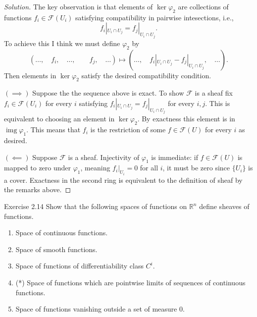 \begin{proof}[Solution]\leavevmode
The key observation is that elements of $\ker \varphi_2$ are collections of functions $f_i \in \mathcal{F}(U_i)$ satisfying compatibility in pairwise intesections, i.e.,
\[f_i|_{U_i \cap U_j}=f_j|_{U_i \cap U_j}.\]
{\color{2}To achieve this} I think we must define $\varphi_2$ by
\[(\ldots,\quad f_i,\quad \ldots,\quad \quad f_j,\quad \ldots)\longmapsto (\ldots,\quad f_i|_{U_i \cap U_j}-f_j|_{U_i \cap U_j},\quad \ldots).\]
Then elements in $\ker \varphi_2$ satisfy the desired compatibility condition.
\iffalse
{\color{2}Indeed:} if $f_i \in \mathcal{F}(U_i)$ and $f_j\in \mathcal{F}(U_j)$ are coordinates of some $F \in \prod_{i}\mathcal{F}(U_i)$, the image of $F$ under  $\varphi_2$ is of the form
\[(\ldots,\;\;\;f_i|_{U_i \cap U_j},\;\;\;\ldots,\;\;\;-f_i|_{U_j \cap U_i},\;\;\;\ldots,\;\;\;f_j|_{U_i \cap U_j},\;\;\;\ldots,\;\;\;-f_j|_{U_j \cap U_i},\;\;\;\ldots)\]
which we assume to be the zero element of $\prod_{i \neq j}\mathcal{F}(U_i \cap U_j)$.\fi

$(\implies )$ Suppose the the sequence above is exact. To show $\mathcal{F}$ is a sheaf fix $f_i \in \mathcal{F}(U_i)$ for every $i$ satisfying $f_i|_{U_i \cap U_j} = f_j |_{U_i \cap U_j}$ for every $i,j$. This is equivalent to choosing an element in $\ker \varphi_2$. By exactness this element is in $\operatorname{img} \varphi_1$. This means that $f_i$ is the restriction of some $f \in \mathcal{F}(U)$ for every $i$ as desired.

$(\impliedby)$ Suppose $\mathcal{F}$ is a sheaf. Injectivity of $\varphi_1$ is immediate: if $f \in \mathcal{F}(U)$ is mapped to zero under $\varphi_1$, meaning $f_i|_{U_i}=0$ for all $i$, it must be zero since $\{U_i\}$ is a cover. Exactness in the second ring is equivalent to the definition of sheaf by the remarks above.
\end{proof} 

\begin{thing4}{Exercise 2.14}\label{exer:2.14}\leavevmode
Show that the following spaces of functions on $\mathbb{R}^n$ define sheaves of functions.
\begin{enumerate}[label=(\alph*)]
\item Space of continuous functions.
\item Space of  smooth functions.
\item Space of functions of differentiability class $C^i$.
\item (*) Space of functions which are pointwise limits of sequences of continuous functions.
\item Space of functions vanishing outside a set of measure 0.
\end{enumerate}
\end{thing4}

